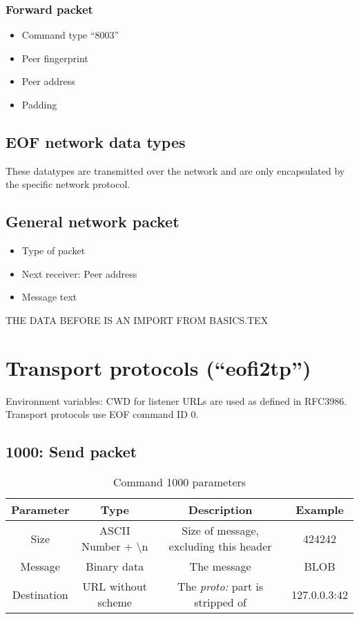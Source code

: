 \documentclass[12pt,a4paper]{book}
\begin{document}
\subsubsection{Forward packet}
\begin{itemize}
\item Command type "`8003"'
\item Peer fingerprint
\item Peer address
\item Padding
\end{itemize}
\subsection{EOF network data types}
These datatypes are transmitted over the network and are only
encapsulated by the specific network protocol.
\subsection{General network packet}
\begin{itemize}
\item Type of packet
\item Next receiver: Peer address
\item Message text
\end{itemize}

THE DATA BEFORE IS AN IMPORT FROM BASICS.TEX

\section{Transport protocols ("`eofi2tp"')}
Environment variables: CWD for listener
URLs are used as defined in RFC3986\cite{uri-1}.
Transport protocols use EOF command ID 0.
\subsection{1000: Send packet}
\begin{longtable}{|c|c|c|c|}
\caption{Command 1000 parameters}\\
\hline
\textbf{Parameter} & \textbf{Type} & \textbf{Description} & \textbf{Example}\\
\hline
Size & ASCII Number + \textbackslash{}n & Size of message, excluding this header & 424242\\
\hline
Message & Binary data & The message & BLOB\\
\hline
Destination & URL without scheme & The \emph{proto:} part is stripped of & 127.0.0.3:42\\
\hline
\end{longtable}
\end{document}
